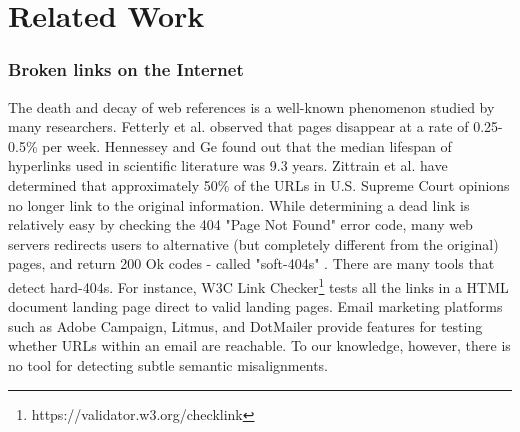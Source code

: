 \documentclass{sigchi}
\begin{document}
                                                         
\section{Related Work}
\subsubsection{Broken links on the Internet}
The death and decay of web references is a well-known phenomenon studied by many researchers. Fetterly et al. \cite{fetterly_large-scale_2003} observed that pages disappear at a rate of 0.25-0.5\% per week. Hennessey and Ge \cite{hennessey_cross_2013} found out that the median lifespan of hyperlinks used in scientific literature was 9.3 years. Zittrain et al. \cite{zittrain_perma:_2014} have determined that approximately 50\% of the URLs in U.S. Supreme Court opinions no longer link to the original information. While determining a dead link is relatively easy by checking the 404 "Page Not Found" error code, many web servers redirects users to alternative (but completely different from the original) pages, and return 200 Ok codes - called "soft-404s" \cite{bar-yossef_sic_2004}. There are many tools that detect hard-404s. For instance, W3C Link Checker\footnote{https://validator.w3.org/checklink} tests all the links in a HTML document landing page direct to valid landing pages. Email marketing platforms such as Adobe Campaign, Litmus, and DotMailer provide features for testing whether URLs within an email are reachable. To our knowledge, however, there is no tool for detecting subtle semantic misalignments. 
\end{document}
